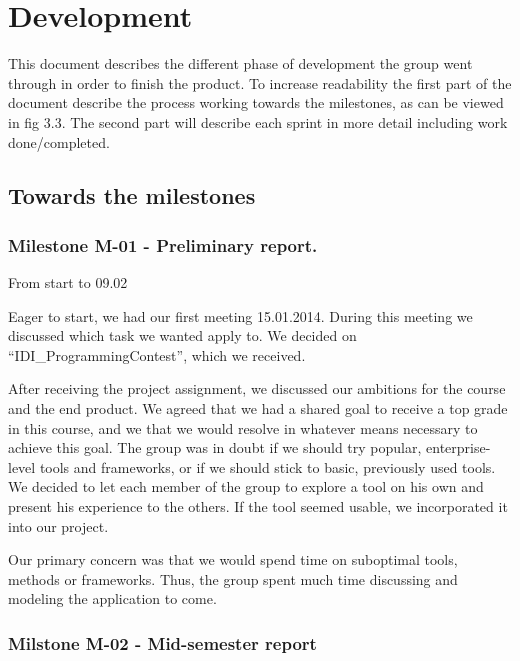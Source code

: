 
\chapter{Development}

This document describes the different phase of development the group
went through in order to finish the product. To increase readability
the first part of the document describe the process working towards the
milestones, as can be viewed in fig 3.3. The second part will describe
each sprint in more detail including work done/completed. 




\section{Towards the milestones}




\subsection{Milestone M-01 - Preliminary report.}

From start to 09.02

Eager to start, we had our first meeting 15.01.2014. During this meeting
we discussed which task we wanted apply to. We decided on
``IDI\_ProgrammingContest'', which
we received. 




After receiving the project assignment, we discussed our ambitions for
the course and the end product. We agreed that we had a shared goal to
receive a top grade in this course, and we that we would resolve in
whatever means necessary to achieve this goal. The group was in doubt
if we should try popular, enterprise-level tools and frameworks, or if
we should stick to basic, previously used tools. We decided to let each
member of the group to explore a tool on his own and present his
experience to the others. If the tool seemed usable, we incorporated it
into our project.




Our primary concern was that we would spend time on suboptimal tools,
methods or frameworks. Thus, the group spent much time discussing and
modeling the application to come. 




\subsection{Milstone M-02 - Mid-semester report}

